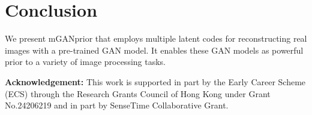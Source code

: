 \documentclass[10pt,twocolumn,letterpaper]{article}
\begin{document}
\section{Conclusion}\label{sec:conclusion}
We present mGANprior that employs multiple latent codes for reconstructing real images with a pre-trained GAN model.
It enables these GAN models as powerful prior to a variety of image processing tasks.


\vspace{1pt}\noindent\textbf{Acknowledgement:}
This work is supported in part by the Early Career Scheme (ECS) through the Research Grants Council of Hong Kong under Grant No.24206219 and in part by SenseTime Collaborative Grant.


{\small


}
\end{document}
